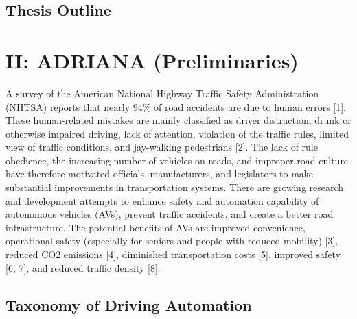 \section{Thesis Outline}




\chapter{II: ADRIANA (Preliminaries)}

\begin{chapterabstract}
	\lipsum[1]
\end{chapterabstract}


A survey of the American National Highway Traffic Safety Administration (NHTSA) reports that nearly 94\% of road accidents are due to human errors [1]. 
These human-related mistakes are mainly classified as driver distraction, drunk or otherwise impaired driving, lack of attention, violation of the traffic rules, limited view of traffic conditions, and jay-walking pedestrians [2]. 
The lack of rule obedience, the increasing number of vehicles on roads, and improper road culture have therefore motivated officials, manufacturers, and legislators to make substantial improvements in transportation systems. 
There are growing research and development attempts to enhance safety and automation capability of autonomous vehicles (AVs), prevent traffic accidents, and create a better road infrastructure. 
The potential benefits of AVs are improved convenience, operational safety (especially for seniors and people with reduced mobility) [3], reduced CO2 emissions [4], diminished transportation costs [5], improved safety [6, 7], and reduced traffic density [8].

\section{Taxonomy of Driving Automation}

